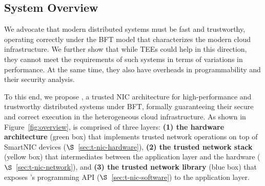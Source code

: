 



\subsection{System Overview}
We advocate that modern distributed systems must be fast and trustworthy, operating correctly under the BFT model that characterizes the modern cloud infrastructure. We further show that while TEEs could help in this direction, they cannot meet the requirements of such systems in terms of variations in performance. At the same time, they also have overheads in programmability and their security analysis.

To this end, we propose \projecttitle{}, a trusted NIC architecture for high-performance and trustworthy distributed systems under BFT, formally guaranteeing their secure and correct execution in the heterogeneous cloud infrastructure. 
As shown in Figure~\ref{fig:overview}, \projecttitle{} is comprised of three layers: {\bf (1)  the \projecttitle{} hardware architecture} (green box) that implements trusted network operations on top of SmartNIC devices ($\S$~\ref{sec:t-nic-hardware}), {\bf (2) the \projecttitle{} trusted network stack} (yellow box) that intermediates between the application layer and the \projecttitle{} hardware ($\S$~\ref{sec:t-nic-network}), and {\bf (3)  the \projecttitle{} trusted network library} (blue box) that exposes \projecttitle{}'s programming API ($\S$~\ref{sec:t-nic-software}) to the application layer. 

